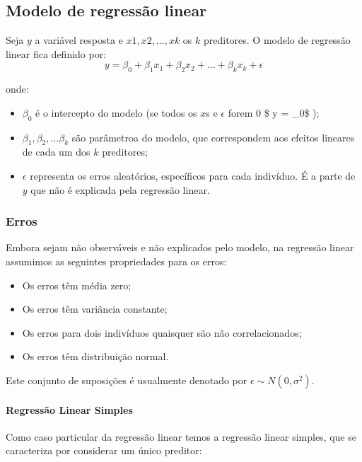\documentclass[
]{article}
\providecommand{\tightlist}{%
  \setlength{\itemsep}{0pt}\setlength{\parskip}{0pt}}
\begin{document}
\subsection{Modelo de regressão
linear}\label{modelo-de-regressuxe3o-linear}

Seja \(y\) a variável resposta e \(x1, x2, ..., xk\) os \(k\)
preditores. O modelo de regressão linear fica definido por: \[
y = \beta_0 + \beta_1 x_1 + \beta_2 x_2 + ... + \beta_k x_k + \epsilon
\]

onde:

\begin{itemize}
\tightlist
\item
  \(\beta_0\) é o intercepto do modelo (se todos os \(x\)s e
  \(\epsilon\) forem 0 \$ y = \beta\_0\$ );
\item
  \(\beta_1, \beta_2, ... \beta_k\) são parâmetroa do modelo, que
  correspondem aos efeitos lineares de cada um dos \(k\) preditores;
\item
  \(\epsilon\) representa os erros aleatórios, específicos para cada
  indivíduo. É a parte de \(y\) que não é explicada pela regressão
  linear.
\end{itemize}

\subsubsection{Erros}\label{erros}

Embora sejam não observáveis e não explicados pelo modelo, na regressão
linear assumimos as seguintes propriedades para os erros:

\begin{itemize}
\tightlist
\item
  Os erros têm média zero;
\item
  Os erros têm variância constante;
\item
  Os erros para dois indivíduos quaisquer são não correlacionados;
\item
  Os erros têm distribuição normal.
\end{itemize}

Este conjunto de suposições é usualmente denotado por
\(\epsilon \sim N (0, \sigma^2)\).

\paragraph{Regressão Linear Simples}\label{regressuxe3o-linear-simples}

Como caso particular da regressão linear temos a regressão linear
simples, que se caracteriza por considerar um único preditor:
\end{document}
